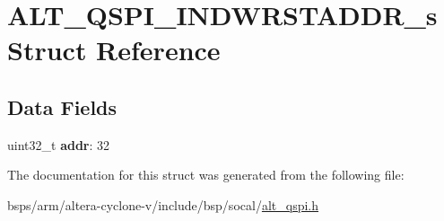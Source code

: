 \hypertarget{structALT__QSPI__INDWRSTADDR__s}{}\section{A\+L\+T\+\_\+\+Q\+S\+P\+I\+\_\+\+I\+N\+D\+W\+R\+S\+T\+A\+D\+D\+R\+\_\+s Struct Reference}
\label{structALT__QSPI__INDWRSTADDR__s}
\subsection*{Data Fields}
\begin{DoxyCompactItemize}
\item 
\mbox{\label{structALT__QSPI__INDWRSTADDR__s_ab76602ac60bf5413cf74798eee81f12d}} 
uint32\+\_\+t {\bfseries addr}\+: 32
\end{DoxyCompactItemize}


The documentation for this struct was generated from the following file\+:\begin{DoxyCompactItemize}
\item 
bsps/arm/altera-\/cyclone-\/v/include/bsp/socal/\mbox{\hyperlink{include_2bsp_2socal_2alt__qspi_8h}{alt\+\_\+qspi.\+h}}\end{DoxyCompactItemize}
